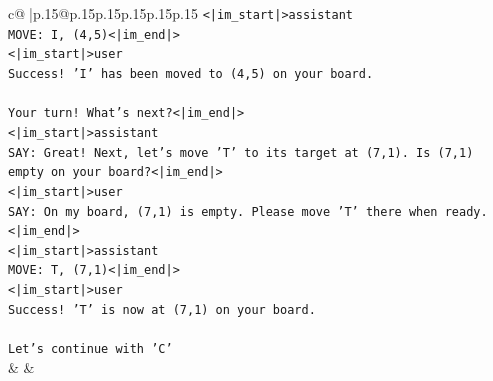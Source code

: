 \documentclass{article}
\begin{document}
{\begin{supertabular}{c@{$\;$}|p{.15\linewidth}@{}p{.15\linewidth}p{.15\linewidth}p{.15\linewidth}p{.15\linewidth}p{.15\linewidth}}
{{{\texttt{<|im\_start|>assistant} \\
\texttt{MOVE: I, (4,5)<|im\_end|>} \\
\texttt{<|im\_start|>user} \\
\texttt{Success! 'I' has been moved to (4,5) on your board.} \\
\\ 
\texttt{Your turn! What's next?<|im\_end|>} \\
\texttt{<|im\_start|>assistant} \\
\texttt{SAY: Great! Next, let's move 'T' to its target at (7,1). Is (7,1) empty on your board?<|im\_end|>} \\
\texttt{<|im\_start|>user} \\
\texttt{SAY: On my board, (7,1) is empty. Please move 'T' there when ready.<|im\_end|>} \\
\texttt{<|im\_start|>assistant} \\
\texttt{MOVE: T, (7,1)<|im\_end|>} \\
\texttt{<|im\_start|>user} \\
\texttt{Success! 'T' is now at (7,1) on your board.} \\
\\ 
\texttt{Let's continue with 'C'} \\
            }
        }
    }
    & & \\ \\


\end{supertabular}}
\end{document}
